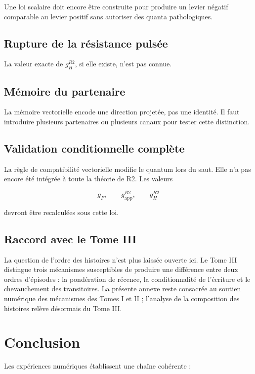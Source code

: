 Une loi scalaire doit encore être construite pour produire un levier
négatif comparable au levier positif sans autoriser des quanta
pathologiques.

\subsection{Rupture de la résistance pulsée}

La valeur exacte de \(g_H^{R2}\), si elle existe, n'est pas connue.

\subsection{Mémoire du partenaire}

La mémoire vectorielle encode une direction projetée, pas une identité.
Il faut introduire plusieurs partenaires ou plusieurs canaux pour
tester cette distinction.

\subsection{Validation conditionnelle complète}

La règle de compatibilité vectorielle modifie le quantum lors du saut.
Elle n'a pas encore été intégrée à toute la théorie de R2. Les valeurs

\[
g_F,
\qquad
g_{\mathrm{app}}^{R2},
\qquad
g_H^{R2}
\]

devront être recalculées sous cette loi.

\subsection*{Raccord avec le Tome III}

La question de l'ordre des histoires n'est plus laissée ouverte ici.
Le Tome III distingue trois mécanismes susceptibles de produire une
différence entre deux ordres d'épisodes : la pondération de récence,
la conditionnalité de l'écriture et le chevauchement des transitoires.
La présente annexe reste consacrée au soutien numérique des mécanismes
des Tomes I et II ; l'analyse de la composition des histoires relève
désormais du Tome III.

\section{Conclusion}
\label{annexe-num-conclusion}

Les expériences numériques établissent une chaîne cohérente :

